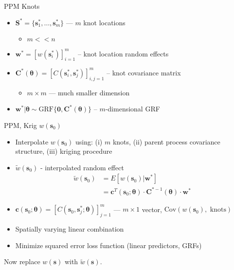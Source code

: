 \documentclass{beamer}
\begin{document}
\begin{frame}{PPM Knots}
\begin{itemize}
\addtolength{\itemsep}{0.5\baselineskip}
\item $\pmb{S}^{*} = \{\pmb{s}_{1}^{*}, \dots, \pmb{s}_{m}^{*}\}$ --- $m$ knot locations
  \begin{itemize}
  \item $m < < n$ 
  \end{itemize}
\item $\pmb{w}^{*} = \left[w(\pmb{s}_{i}^{*})\right]_{i=1}^{m}$ -- knot location random effects
\item $\pmb{C}^{*}(\pmb{\theta}) = \left[C(\pmb{s}_{i}^{*}, \pmb{s}_{j}^{*})\right]_{i,j = 1}^{m}$ -- knot covariance matrix
  \begin{itemize}
  \item $m \times m$ --- much smaller dimension
  \end{itemize}
\item $\pmb{w}^{*}|\pmb{\theta} \sim \text{GRF}\{\pmb{0}, \pmb{C}^{*}(\pmb{\theta})\}$ -- $m$-dimensional GRF
\end{itemize}

\end{frame}

\begin{frame}{PPM, Krig $w(\pmb{s}_{0})$}
\begin{itemize}
\addtolength{\itemsep}{0.5\baselineskip}
\item Interpolate $w(\pmb{s}_{0})$ using: (i) $m$ knots, (ii) parent process covariance structure, (iii) kriging procedure
\item  $\tilde{w}(\pmb{s}_{0})$ - interpolated random effect
\begin{align*}
\tilde{w}(\pmb{s}_{0}) &= E[w(\pmb{s}_{0})|\pmb{w}^{*}] \\
&= \pmb{c}^{T}(\pmb{s}_{0};\pmb{\theta}) \cdot \pmb{C}^{*-1}(\pmb{\theta}) \cdot \pmb{w}^{*}
\end{align*}
\item $\pmb{c}(\pmb{s}_{0};\pmb{\theta}) = \left[C(\pmb{s}_{0}, \pmb{s}_{j}^{*}; \pmb{\theta})\right]_{j = 1}^{m}$ --- $m \times 1$ vector, $\text{Cov}(w(\pmb{s}_{0}), \text{ knots})$
\item Spatially varying linear combination
\item Minimize squared error loss function (linear predictors, GRFs) 
\end{itemize}

Now replace $w(\pmb{s})$ with $\tilde{w}(\pmb{s})$.
\end{frame}
\end{document}
